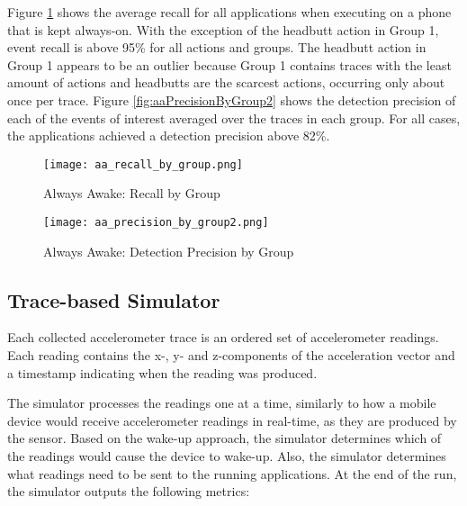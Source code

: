 Figure \ref{fig:aaRecallByGroup} shows the average recall for all
applications when executing on a phone that is kept always-on.  With
the exception of the headbutt action in Group 1, event recall is above
95\% for all actions and groups. The headbutt action in Group 1
appears to be an outlier because Group 1 contains traces with the
least amount of actions and headbutts are the scarcest actions,
occurring only about once per trace. Figure
\ref{fig:aaPrecisionByGroup2} shows the detection precision of each of
the events of interest averaged over the traces in each group. For all
cases, the applications achieved a detection precision above 82\%.



\begin{figure}[t]
	\texttt{[image: aa\_recall\_by\_group.png]}
	\caption{Always Awake: Recall by Group}
    	\label{fig:aaRecallByGroup}
\end{figure}


\begin{figure}[t]
	\texttt{[image: aa\_precision\_by\_group2.png]}
	\caption{Always Awake: Detection Precision by Group}
    	\label{fig:aaPrecisionByGroup}
\end{figure}


\subsection{Trace-based Simulator}

Each collected accelerometer trace is an ordered set of accelerometer
readings. Each reading contains the x-, y- and z-components of the
acceleration vector and a timestamp indicating when the reading was
produced.

The simulator processes the readings one at a time, similarly to how a
mobile device would receive accelerometer readings in real-time, as
they are produced by the sensor. Based on the wake-up approach, the
simulator determines which of the readings would cause the device to
wake-up. Also, the simulator determines what readings need to be sent
to the running applications. At the end of the run, the simulator
outputs the following metrics:

